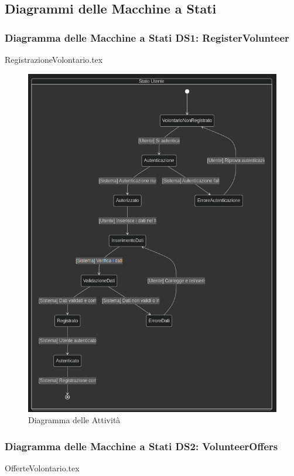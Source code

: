 \documentclass[12pt]{article}
\begin{document}
\subsection{Diagrammi delle Macchine a Stati}

\subsubsection{Diagramma delle Macchine a Stati DS1: RegisterVolunteer}
{RegistrazioneVolontario.tex}

\begin{figure}[H]
    \includegraphics[width=\textwidth, height=\textheight,keepaspectratio]{Immagini/DS/Iterazione 1/DSRegistrazioneVolontario.png}
        \caption{Diagramma delle Attività}
        \label{fig:diagrammaDS1}
\end{figure}

\subsubsection{Diagramma delle Macchine a Stati DS2: VolunteerOffers}
{OfferteVolontario.tex}
\end{document}
